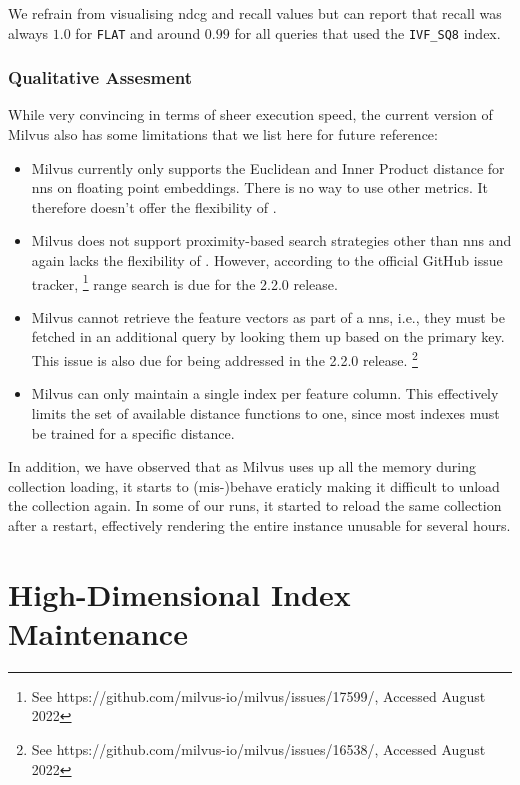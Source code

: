 We refrain from visualising n\acrshort{dcg} and recall values but can report that recall was always $1.0$ for \texttt{FLAT} and around $0.99$ for all queries that used the \texttt{IVF\_SQ8} index.

\subsubsection{Qualitative Assesment}
While very convincing in terms of sheer execution speed, the current version of Milvus also has some limitations that we list here for future reference:

\begin{itemize}
    \item Milvus currently only supports the Euclidean and Inner Product distance for \acrshort{nns} on floating point embeddings. There is no way to use other metrics. It therefore doesn't offer the flexibility of \cottontail{}.
    \item Milvus does not support proximity-based search strategies other than \acrshort{nns} and again lacks the flexibility of \cottontail{}. However, according to the official GitHub issue tracker, \footnote{See https://github.com/milvus-io/milvus/issues/17599/, Accessed August 2022} range search is due for the 2.2.0 release. 
    \item Milvus cannot retrieve the feature vectors as part of a \acrshort{nns}, i.e., they must be fetched in an additional query by looking them up based on the primary key. This issue is also due for being addressed in the 2.2.0 release. \footnote{See https://github.com/milvus-io/milvus/issues/16538/, Accessed August 2022}
    \item Milvus can only maintain a single index per feature column. This effectively limits the set of available distance functions to one, since most indexes must be trained for a specific distance.
\end{itemize}

In addition, we have observed that as Milvus uses up all the memory during collection loading, it starts to (mis-)behave eraticly making it difficult to unload the collection again. In some of our runs, it started to reload the same collection after a restart, effectively rendering the entire instance unusable for several hours.

\section{High-Dimensional Index Maintenance}
\label{section:hd_index_maintenance_evaluation}

